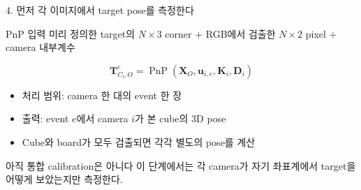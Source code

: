 \documentclass[aspectratio=169,11pt]{beamer}
\newcommand{\T}[2]{\mathbf T_{#1,#2}}
\begin{document}
\begin{frame}{4. 먼저 각 이미지에서 target pose를 측정한다}
  \begin{block}{PnP 입력}
    \centering
    미리 정의한 target의 $N\!\times\!3$ corner
    $+$ RGB에서 검출한 $N\!\times\!2$ pixel
    $+$ camera 내부계수
  \end{block}

  \[
    \T{C_i}{O}^{e}
    =\operatorname{PnP}
    \left(\mathbf X_O,\mathbf u_{i,e},\mathbf K_i,\mathbf D_i\right)
  \]

  \begin{itemize}
    \item 처리 범위: camera 한 대의 event 한 장
    \item 출력: event $e$에서 camera $i$가 본 cube의 3D pose
    \item Cube와 board가 모두 검출되면 각각 별도의 pose를 계산
  \end{itemize}

  \vfill
  \begin{alertblock}{아직 통합 calibration은 아니다}
    이 단계에서는 각 camera가 자기 좌표계에서 target을 어떻게 보았는지만 측정한다.
  \end{alertblock}
\end{frame}
\end{document}
